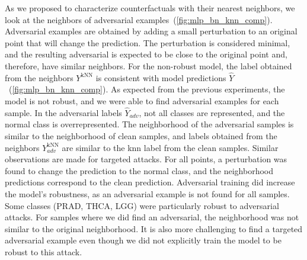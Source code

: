 \documentclass[../main.tex]{subfiles}
\begin{document}
		As we proposed to characterize counterfactuals with their nearest neighbors, we look at the neighbors of adversarial examples~(\cref{fig:mlp_bn_knn_comp}).
		Adversarial examples are obtained by adding a small perturbation to an original point that will change the prediction.
		The perturbation is considered minimal, and the resulting adversarial is expected to be close to the original point and, therefore, have similar neighbors.
		For the non-robust model, the label obtained from the neighbors \(Y^{\text{kNN}}\) is consistent with model predictions \(\hat{Y}\)~(\cref{fig:mlp_bn_knn_comp}).
		As expected from the previous experiments, the model is not robust, and we were able to find adversarial examples for each sample.
		In the adversarial labels \(\hat{Y}_{adv}\), not all classes are represented, and the normal class is overrepresented.
		The neighborhood of the adversarial samples is similar to the neighborhood of clean samples, and labels obtained from the neighbors \(Y^{\text{kNN}}_{adv}\) are similar to the \gls{knn} label from the clean samples.
		Similar observations are made for targeted attacks.
		For all points, a perturbation was found to change the prediction to the normal class, and the neighborhood predictions correspond to the clean prediction.
		Adversarial training did increase the model's robustness, as an adversarial example is not found for all samples.
		Some classes (PRAD, THCA, LGG) were particularly robust to adversarial attacks.
		For samples where we did find an adversarial, the neighborhood was not similar to the original neighborhood.
		It is also more challenging to find a targeted adversarial example even though we did not explicitly train the model to be robust to this attack.
\end{document}
